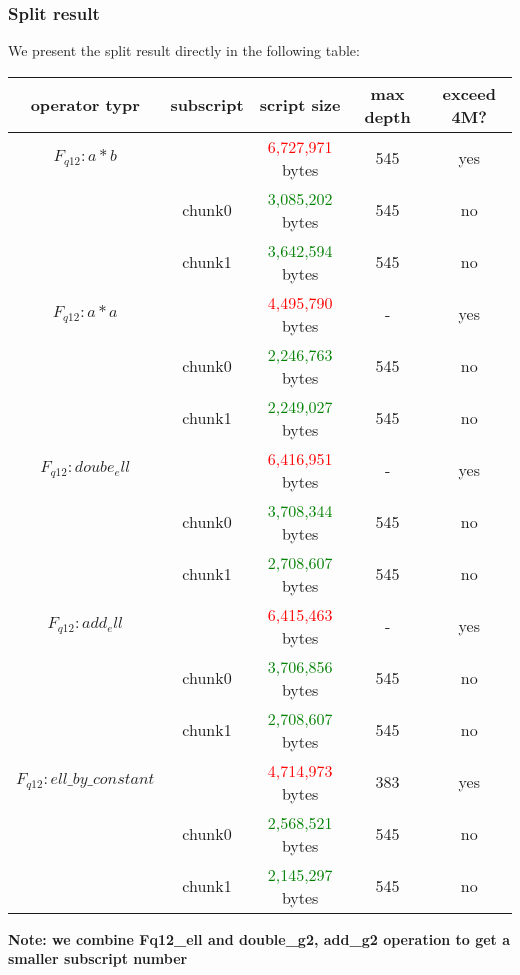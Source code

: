 \subsubsection{Split result}

We present the split result directly in the following table:

\begin{center}
\begin{tabular}{|c|c|c|c|c|} \hline
    operator typr & subscript & script size & max depth & exceed 4M? \\ \hline
    $F_{q12}: a * b$ & & \textcolor{red}{6,727,971} bytes & 545 & yes \\ \hline
     & chunk0 & \textcolor{green}{ 3,085,202 } bytes & 545 & no \\ \hline
     & chunk1 & \textcolor{green}{ 3,642,594} bytes & 545 & no \\ \hline
    $F_{q12}: a * a$ & & \textcolor{red}{4,495,790} bytes & - & yes \\ \hline
    & chunk0 & \textcolor{green}{2,246,763} bytes & 545 & no \\ \hline
    & chunk1 & \textcolor{green}{2,249,027} bytes & 545 & no \\ \hline
    $F_{q12}: doube_ell $ & & \textcolor{red}{6,416,951} bytes & - & yes \\ \hline
    & chunk0 & \textcolor{green}{3,708,344} bytes & 545 & no \\ \hline
    & chunk1 & \textcolor{green}{2,708,607} bytes & 545 & no \\ \hline
    $F_{q12}: add_ell $ & & \textcolor{red}{6,415,463} bytes & - & yes \\ \hline
    & chunk0 & \textcolor{green}{3,706,856} bytes & 545 & no \\ \hline
    & chunk1 & \textcolor{green}{2,708,607} bytes & 545 & no \\ \hline
    $F_{q12}: ell\_by\_constant$ & & \textcolor{red}{4,714,973} bytes & 383 & yes \\ \hline
    & chunk0 & \textcolor{green}{2,568,521} bytes & 545 & no \\ \hline
    & chunk1 & \textcolor{green}{2,145,297} bytes & 545 & no \\ \hline
\end{tabular}
\end{center}

\textbf{Note: we combine Fq12\_ell and double\_g2, add\_g2 operation to get a smaller subscript number}
